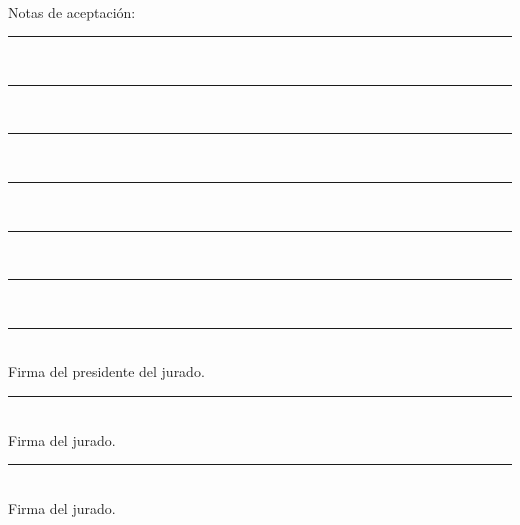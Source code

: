 \paragraph{ }
\begin{flushright}
Notas de aceptación: \\
\vspace{5 mm}
\rule[0.5cm]{5cm}{0.5pt} \\ 
\rule[0.5cm]{5cm}{0.5pt} \\
\rule[0.5cm]{5cm}{0.5pt} \\
\rule[0.5cm]{5cm}{0.5pt} \\
\rule[0.5cm]{5cm}{0.5pt} \\
\rule[0.5cm]{5cm}{0.5pt} \\
\vspace{5cm}
\rule[0.1cm]{5cm}{0.5pt} \\
Firma del presidente del jurado.\\
\vspace{3cm}
\rule[0.1cm]{5cm}{0.5pt} \\
Firma del jurado.\\
\vspace{3cm}
\rule[0.1cm]{5cm}{0.5pt} \\
Firma del jurado.
\end{flushright}

